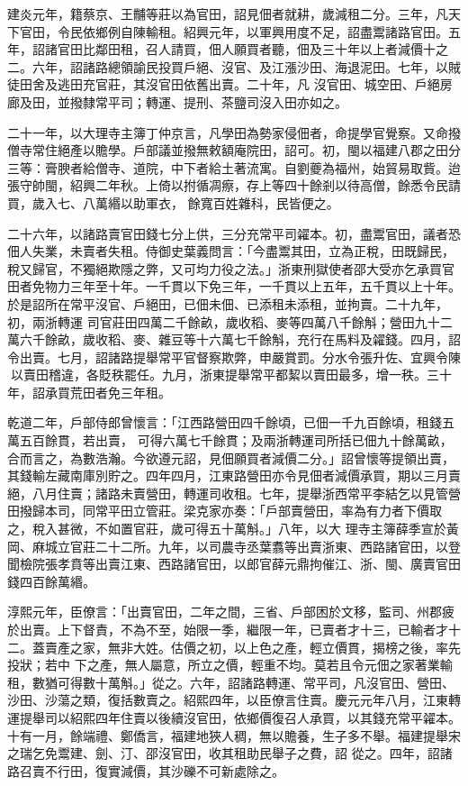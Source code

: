 \begin{pinyinscope}
 建炎元年，籍蔡京、王黼等莊以為官田，詔見佃者就耕，歲減租二分。三年，凡天下官田，令民依鄉例自陳輸租。紹興元年，以軍興用度不足，詔盡鬻諸路官田。五年，詔諸官田比鄰田租，召人請買，佃人願買者聽，佃及三十年以上者減價十之二。六年，詔諸路總領諭民投買戶絕、沒官、及江漲沙田、海退泥田。七年，以賊徒田舍及逃田充官莊，其沒官田依舊出賣。二十年，凡
 沒官田、城空田、戶絕房廊及田，並撥隸常平司；轉運、提刑、茶鹽司沒入田亦如之。



 二十一年，以大理寺主簿丁仲京言，凡學田為勢家侵佃者，命提學官覺察。又命撥僧寺常住絕產以贍學。戶部議並撥無敕額庵院田，詔可。初，閩以福建八郡之田分三等：膏腴者給僧寺、道院，中下者給土著流寓。自劉夔為福州，始貿易取貲。迨張守帥閩，紹興二年秋。上倚以拊循凋瘵，存上等四十餘剎以待高僧，餘悉令民請買，歲入七、八萬緡以助軍衣，
 餘寬百姓雜科，民皆便之。



 二十六年，以諸路賣官田錢七分上供，三分充常平司糴本。初，盡鬻官田，議者恐佃人失業，未賣者失租。侍御史葉義問言：「今盡鬻其田，立為正稅，田既歸民，稅又歸官，不獨絕欺隱之弊，又可均力役之法。」浙東刑獄使者邵大受亦乞承買官田者免物力三年至十年。一千貫以下免三年，一千貫以上五年，五千貫以上十年。於是詔所在常平沒官、戶絕田，已佃未佃、已添租未添租，並拘賣。二十九年，初，兩浙轉運
 司官莊田四萬二千餘畝，歲收稻、麥等四萬八千餘斛；營田九十二萬六千餘畝，歲收稻、麥、雜豆等十六萬七千餘斛，充行在馬料及糴錢。四月，詔令出賣。七月，詔諸路提舉常平官督察欺弊，申嚴賞罰。分水令張升佐、宜興令陳𨑖以賣田稽違，各貶秩罷任。九月，浙東提舉常平都絜以賣田最多，增一秩。三十年，詔承買荒田者免三年租。



 乾道二年，戶部侍郎曾懷言：「江西路營田四千餘頃，已佃一千九百餘頃，租錢五萬五百餘貫，若出賣，
 可得六萬七千餘貫；及兩浙轉運司所括已佃九十餘萬畝，合而言之，為數浩瀚。今欲遵元詔，見佃願買者減價二分。」詔曾懷等提領出賣，其錢輸左藏南庫別貯之。四年四月，江東路營田亦令見佃者減價承買，期以三月賣絕，八月住賣；諸路未賣營田，轉運司收租。七年，提舉浙西常平李結乞以見管營田撥歸本司，同常平田立管莊。梁克家亦奏：「戶部賣營田，率為有力者下價取之，稅入甚微，不如置官莊，歲可得五十萬斛。」八年，以大
 理寺主簿薛季宣於黃岡、麻城立官莊二十二所。九年，以司農寺丞葉翥等出賣浙東、西路諸官田，以登聞檢院張孝賁等出賣江東、西路諸官田，以郎官薛元鼎拘催江、浙、閩、廣賣官田錢四百餘萬緡。



 淳熙元年，臣僚言：「出賣官田，二年之間，三省、戶部困於文移，監司、州郡疲於出賣。上下督責，不為不至，始限一季，繼限一年，已賣者才十三，已輸者才十二。蓋賣產之家，無非大姓。估價之初，以上色之產，輕立價貫，揭榜之後，率先投狀；若中
 下之產，無人屬意，所立之價，輕重不均。莫若且令元佃之家著業輸租，數猶可得數十萬斛。」從之。六年，詔諸路轉運、常平司，凡沒官田、營田、沙田、沙蕩之類，復括數賣之。紹熙四年，以臣僚言住賣。慶元元年八月，江東轉運提舉司以紹熙四年住賣以後續沒官田，依鄉價復召人承買，以其錢充常平糴本。十有一月，餘端禮、鄭僑言，福建地狹人稠，無以贍養，生子多不舉。福建提舉宋之瑞乞免鬻建、劍、汀、邵沒官田，收其租助民舉子之費，詔
 從之。四年，詔諸路召賣不行田，復實減價，其沙礫不可新處除之。




\end{pinyinscope}
